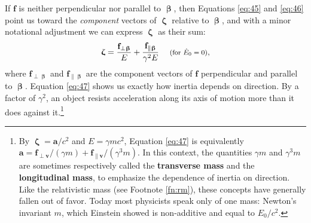 \documentclass[12pt]{article}
\renewcommand{\vv}[1]{\mathbf{#1}}
\newcommand{\vvbeta}{\bm{\upbeta}}
\newcommand{\vvzeta}{\bm{\upzeta}}
\begin{document}
If $\vv f$ is neither perpendicular nor parallel to $\vvbeta$, then Equations \ref{eq:45} and \ref{eq:46} point us toward the \emph{component} vectors of $\vvzeta$ relative to $\vvbeta$, and with a minor notational adjustment we can express $\vvzeta$ as their sum:
\begin{equation}\label{eq:47}
\vvzeta = \frac{\vv f_{\perp \vvbeta}}{E} + \frac{\vv f_{\parallel \vvbeta}}{\gamma^2 E} \quad \textrm{\footnotesize{ (for $\dot{E}_0 = 0$)}},
\end{equation}
where $\vv f_{\perp \vvbeta}$ and $\vv f_{\parallel \vvbeta}$ are the component vectors of $\vv f$ perpendicular and parallel to $\vvbeta$. Equation \ref{eq:47} shows us exactly how inertia depends on direction. By a factor of $\gamma^2$, an object resists acceleration along its axis of motion more than it does against it.\footnote{By $\vvzeta = \vv a / c^2$ and $E = \gamma mc^2$, Equation \ref{eq:47} is equivalently $\vv a = \vv f_{\perp \vv v} / (\gamma m) + \vv f_{\parallel \vv v} / (\gamma^3 m)$. In this context, the quantities $\gamma m$ and $\gamma^3 m$ are sometimes respectively called the \textbf{transverse mass} and the \textbf{longitudinal mass}, to emphasize the dependence of inertia on direction. Like the relativistic mass (see Footnote \ref{fn:rm}), these concepts have generally fallen out of favor. Today most physicists speak only of one mass: Newton's invariant $m$, which Einstein showed is non-additive and equal to $E_0 / c^2$.}
\end{document}
